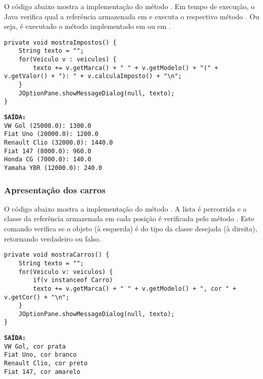 O código abaixo mostra a implementação do método . Em tempo de execução, o Java verifica qual a referência armazenada em  e executa o respectivo método . Ou seja, é executado o método implementado em  ou em .

\begin{verbatim}
private void mostraImpostos() {
	String texto = "";
	for(Veiculo v : veiculos) {
		texto += v.getMarca() + " " + v.getModelo() + "(" + v.getValor() + "): " + v.calculaImposto() + "\n";
	}
	JOptionPane.showMessageDialog(null, texto);
}
\end{verbatim}

\begin{minipage}{\textwidth}
	\textbf{\texttt{SAÍDA:}}\\
	\texttt{VW Gol (25000.0): 1300.0}\\
	\texttt{Fiat Uno (20000.0): 1200.0}\\
	\texttt{Renault Clio (32000.0): 1440.0}\\
	\texttt{Fiat 147 (8000.0): 960.0}\\
	\texttt{Honda CG (7000.0): 140.0}\\
	\texttt{Yamaha YBR (12000.0): 240.0}
\end{minipage}

\subsubsection{Apresentação dos carros}

O código abaixo mostra a implementação do método . A lista é percorrida e a classe da referência armazenada em cada posição é verificada pelo método . Este comando verifica se o objeto (à esquerda) é do tipo da classe desejada (à direita), retornando verdadeiro ou falso.

\begin{verbatim}
private void mostraCarros() {
	String texto = "";
	for(Veiculo v: veiculos) {
		if(v instanceof Carro)
		texto += v.getMarca() + " " + v.getModelo() + ", cor " + v.getCor() + "\n";
	}
	JOptionPane.showMessageDialog(null, texto);
}
\end{verbatim}

\begin{minipage}{\textwidth}
	\textbf{\texttt{SAÍDA:}}\\
	\texttt{VW Gol, cor prata}\\
	\texttt{Fiat Uno, cor branco}\\
	\texttt{Renault Clio, cor preto}\\
	\texttt{Fiat 147, cor amarelo}
\end{minipage}


